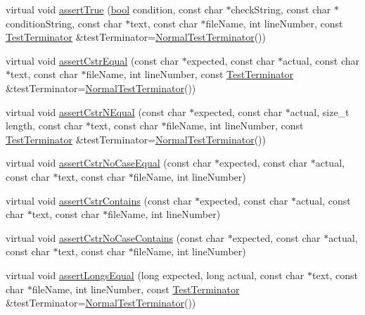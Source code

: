 \begin{DoxyCompactItemize}
\item 
virtual void \hyperlink{class_utest_shell_ae94c3261aae58fd432f56530ed93fac0}{assert\+True} (\hyperlink{avb__gptp_8h_af6a258d8f3ee5206d682d799316314b1}{bool} condition, const char $\ast$check\+String, const char $\ast$condition\+String, const char $\ast$text, const char $\ast$file\+Name, int line\+Number, const \hyperlink{class_test_terminator}{Test\+Terminator} \&test\+Terminator=\hyperlink{class_normal_test_terminator}{Normal\+Test\+Terminator}())
\item 
virtual void \hyperlink{class_utest_shell_aabd5eeb6ba32e6101c0ec8e058a2518c}{assert\+Cstr\+Equal} (const char $\ast$expected, const char $\ast$actual, const char $\ast$text, const char $\ast$file\+Name, int line\+Number, const \hyperlink{class_test_terminator}{Test\+Terminator} \&test\+Terminator=\hyperlink{class_normal_test_terminator}{Normal\+Test\+Terminator}())
\item 
virtual void \hyperlink{class_utest_shell_a14fdfe6489e95bf228cdb05b3d41d9c3}{assert\+Cstr\+N\+Equal} (const char $\ast$expected, const char $\ast$actual, size\+\_\+t length, const char $\ast$text, const char $\ast$file\+Name, int line\+Number, const \hyperlink{class_test_terminator}{Test\+Terminator} \&test\+Terminator=\hyperlink{class_normal_test_terminator}{Normal\+Test\+Terminator}())
\item 
virtual void \hyperlink{class_utest_shell_ac9d08e315dbe87ee9286acabe85b51da}{assert\+Cstr\+No\+Case\+Equal} (const char $\ast$expected, const char $\ast$actual, const char $\ast$text, const char $\ast$file\+Name, int line\+Number)
\item 
virtual void \hyperlink{class_utest_shell_a02142e9582af1a9e622200fe46a3a15f}{assert\+Cstr\+Contains} (const char $\ast$expected, const char $\ast$actual, const char $\ast$text, const char $\ast$file\+Name, int line\+Number)
\item 
virtual void \hyperlink{class_utest_shell_afca15ab751bda33d3784efe4b06bf875}{assert\+Cstr\+No\+Case\+Contains} (const char $\ast$expected, const char $\ast$actual, const char $\ast$text, const char $\ast$file\+Name, int line\+Number)
\item 
virtual void \hyperlink{class_utest_shell_aa9675257925548a20a426cc32c6883c5}{assert\+Longs\+Equal} (long expected, long actual, const char $\ast$text, const char $\ast$file\+Name, int line\+Number, const \hyperlink{class_test_terminator}{Test\+Terminator} \&test\+Terminator=\hyperlink{class_normal_test_terminator}{Normal\+Test\+Terminator}())
\item 

\end{DoxyCompactItemize}
